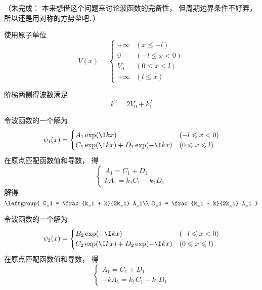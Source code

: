 
（未完成： 本来想借这个问题来讨论波函数的完备性， 但周期边界条件不好弄， 所以还是用对称的方势垒吧．）

使用原子单位
\begin{equation}
V(x) =
\begin{cases}
+\infty  & (x \leqslant -l)\\
0  & (-l \leqslant x < 0)\\
V_0  & (0 \leqslant x \leqslant l)\\
+\infty  & (l \leqslant x)
\end{cases}
\end{equation}

阶梯两侧得波数满足
\begin{equation}
k^2 = 2V_0 + k_1^2
\end{equation}

令波函数的一个解为
\begin{equation}
\psi_1(x) =
\begin{cases}
A_1 \exp(\I k x)  & (-l \leqslant x < 0)\\
C_1 \exp(\I k x) + D_1 \exp(-\I k x) & (0 \leqslant x \leqslant l)
\end{cases}
\end{equation}
在原点匹配函数值和导数， 得
\begin{equation}
\begin{cases}
A_1 = C_1 + D_1\\
kA_1 = k_1 C_1 - k_1 D_1
\end{cases}
\end{equation}
解得
\begin{equation}
\leftgroup{
    C_1 = \frac{k_1 + k}{2k_1} A_1\\
    D_1 = \frac{k_1 - k}{2k_1} A_1
}
\end{equation}

令波函数的一个解为
\begin{equation}
\psi_2(x) =
\begin{cases}
B_2 \exp(-\I k x)  & (-l \leqslant x < 0)\\
C_2 \exp(\I k x) + D_2 \exp(-\I k x) & (0 \leqslant x \leqslant l)
\end{cases}
\end{equation}
在原点匹配函数值和导数， 得
\begin{equation}
\begin{cases}
A_1 = C_1 + D_1\\
-kA_1 = k_1 C_1 - k_1 D_1
\end{cases}
\end{equation}
